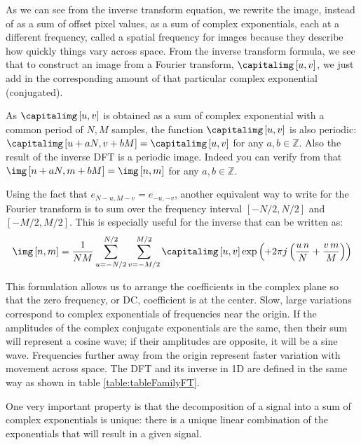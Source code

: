 As we can see from the inverse transform equation, we rewrite the image, instead of as a sum of offset pixel
values, as a sum of complex exponentials, each at a different frequency, called a spatial frequency for images because they describe
how quickly things vary across space.  From the inverse transform formula, we see that to construct an image
from a Fourier transform, $\capitalimg \left[u,v \right]$, we just add in the corresponding
amount of that particular complex exponential (conjugated).

As $\capitalimg \left[u,v \right]$ is obtained as a sum of complex exponential with a common period of $N,M$ samples, the function  $\capitalimg \left[u,v \right]$  is also periodic: $\capitalimg \left[u+aN,v+bM \right] = \capitalimg \left[u,v \right]$ for any $a,b \in \mathbb{Z}$.
Also the result of the inverse DFT is a periodic image. Indeed you can verify from \eqn{\ref{eq:inversefourier}} that $\img \left[n+aN,m+bM \right] = \img \left[n,m \right]$ for any $a,b \in \mathbb{Z}$.



Using the fact that $e_{N-u, M-v} = e_{-u,-v}$, another equivalent way to write for the Fourier transform is to sum over the frequency interval $\left[-N/2, N/2\right]$ and $\left[-M/2, M/2\right]$. This is especially useful for the inverse that can be written as:
\begin{equation}
	\img \left[n,m \right] = \frac{1}{NM} \sum_{u=-N/2}^{N/2} \sum_{v=-M/2}^{M/2} \capitalimg \left[u,v \right]
	\exp{ \left(+2\pi j \left(\frac{u\, n}{N} + \frac{v\, m}{M} \right) \right) }
	\label{eq:inversefourier2}
\end{equation}

This formulation allows us to arrange the coefficients in the complex plane so that the zero frequency, or DC, coefficient is at the center.  Slow, large variations correspond to complex exponentials of
frequencies near the origin.   If the amplitudes of the complex conjugate exponentials are the same, then their sum will represent a cosine wave;  if their amplitudes are opposite, it will be a sine
wave.  Frequencies further away from the origin represent faster
variation with movement across space. The DFT and its inverse in 1D are defined in the same way as shown in table \ref{table:tableFamilyFT}.


One very important property is that the decomposition of a signal into a sum of complex exponentials is unique: there is a unique linear combination of the exponentials that will result in a given signal.

